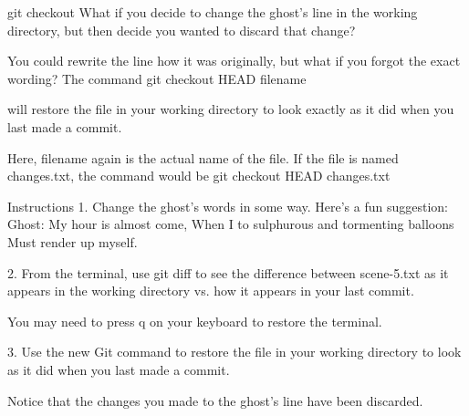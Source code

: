 git checkout
    What if you decide to change the ghost’s line in the working directory, but then decide you wanted to discard that change?

    You could rewrite the line how it was originally, but what if you forgot the exact wording? The command
        git checkout HEAD filename

    will restore the file in your working directory to look exactly as it did when you last made a commit.

    Here, filename again is the actual name of the file. If the file is named changes.txt, the command would be
        git checkout HEAD changes.txt

Instructions
    1.
    Change the ghost’s words in some way. Here’s a fun suggestion:
        Ghost: 
        My hour is almost come,
        When I to sulphurous and tormenting balloons
        Must render up myself. 
 
    2.
    From the terminal, use git diff to see the difference between scene-5.txt as it appears in the working directory vs. how it appears in your last commit.

    You may need to press q on your keyboard to restore the terminal.

    3.
    Use the new Git command to restore the file in your working directory to look as it did when you last made a commit.

    Notice that the changes you made to the ghost’s line have been discarded.
